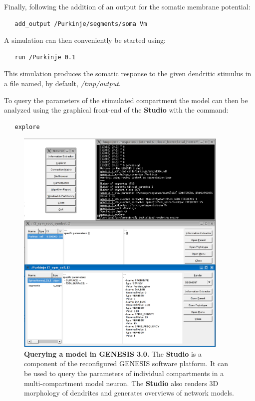 \documentclass[10pt]{article}
\begin{document}
Finally, following the addition of an output for the somatic membrane potential:
\begin{verbatim}
   add_output /Purkinje/segments/soma Vm
\end{verbatim}
A simulation can then conveniently be started using:
\begin{verbatim}
   run /Purkinje 0.1
\end{verbatim}
This simulation produces the somatic response to the given dendritic stimulus in a file named, by default, {\it /tmp/output}.

To query the parameters of the stimulated compartment the model can
then be analyzed using the graphical front-end of the {\bf Studio}
with the command:

\begin{verbatim}
   explore
\end{verbatim}


\begin{figure}[ht]
  \begin{center}
    \includegraphics[width=4in]{figures/studio-screenshot.eps}
  \end{center}
  \caption{ {\bf Querying a model in GENESIS 3.0.} The {\bf Studio} is
    a component of the reconfigured GENESIS software platform. It can
    be used to query the parameters of individual compartments in a
    multi-compartment model neuron. The {\bf Studio} also renders 3D
    morphology of dendrites and generates overviews of network models.
  }
  \label{fig:cbi-studio}
\end{figure}
\end{document}
